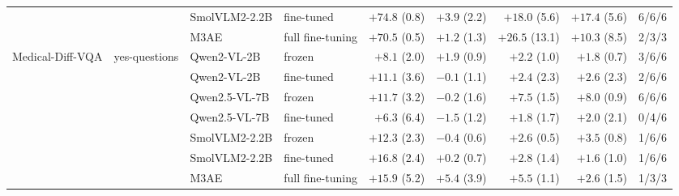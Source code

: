 \begin{table}[t]
{\begin{tabular}{llllrrrrl}
 &  & SmolVLM2-2.2B & fine-tuned & $+74.8$ (0.8) & $+3.9$ (2.2) & $+18.0$ (5.6) & $+17.4$ (5.6) & 6/6/6 \\
 &  & M3AE & full fine-tuning & $+70.5$ (0.5) & $+1.2$ (1.3) & $+26.5$ (13.1) & $+10.3$ (8.5) & 2/3/3 \\
\midrule
Medical-Diff-VQA & yes-questions & Qwen2-VL-2B & frozen & $+8.1$ (2.0) & $+1.9$ (0.9) & $+2.2$ (1.0) & $+1.8$ (0.7) & 3/6/6 \\
 &  & Qwen2-VL-2B & fine-tuned & $+11.1$ (3.6) & $-0.1$ (1.1) & $+2.4$ (2.3) & $+2.6$ (2.3) & 2/6/6 \\
 &  & Qwen2.5-VL-7B & frozen & $+11.7$ (3.2) & $-0.2$ (1.6) & $+7.5$ (1.5) & $+8.0$ (0.9) & 6/6/6 \\
 &  & Qwen2.5-VL-7B & fine-tuned & $+6.3$ (6.4) & $-1.5$ (1.2) & $+1.8$ (1.7) & $+2.0$ (2.1) & 0/4/6 \\
 &  & SmolVLM2-2.2B & frozen & $+12.3$ (2.3) & $-0.4$ (0.6) & $+2.6$ (0.5) & $+3.5$ (0.8) & 1/6/6 \\
 &  & SmolVLM2-2.2B & fine-tuned & $+16.8$ (2.4) & $+0.2$ (0.7) & $+2.8$ (1.4) & $+1.6$ (1.0) & 1/6/6 \\
 &  & M3AE & full fine-tuning & $+15.9$ (5.2) & $+5.4$ (3.9) & $+5.5$ (1.1) & $+2.6$ (1.5) & 1/3/3 \\
\bottomrule
\end{tabular}}

\end{table}
